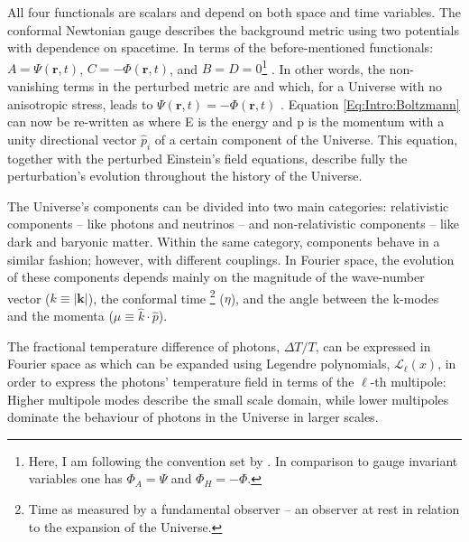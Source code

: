 All four functionals are scalars and depend on both space and time variables. The conformal Newtonian gauge \citep[][p. 87]{dods} describes the background metric using two potentials with dependence on spacetime. In terms of the before-mentioned functionals: $A = \Psi (\textbf{r}, t)$, $C = -\Phi (\textbf{r}, t)$, and $B=D=0$\footnote{Here, I am following the convention set by \cite{dods}. In comparison to \cite{1980Bardeen} gauge invariant variables one has $\Phi_A = \Psi$ and $\Phi_H = -\Phi$. } \citep{1995Gauges}. In other words, the non-vanishing terms in the perturbed metric are
and 
which, for a Universe with no anisotropic stress, leads to $\Psi (\textbf{r},t) = - \Phi(\textbf{r},t)$ \citep{Peacock}. Equation \eqref{Eq:Intro:Boltzmann} can now be re-written as
where E is the energy and p is the momentum with a unity directional vector $\hat{p}_i$ of a certain component of the Universe. This equation, together with the perturbed Einstein's field equations, describe fully the perturbation's evolution throughout the history of the Universe.

\qquad The Universe's components can be divided into two main categories: relativistic components -- like photons and neutrinos -- and non-relativistic components -- like dark and baryonic matter. Within the same category, components behave in a similar fashion; however, with different couplings. In Fourier space, the evolution of these components depends mainly on the magnitude of the wave-number vector ($k \equiv |\textbf{k}|$), the conformal time \footnote{Time as measured by a fundamental observer -- an observer at rest in relation to the expansion of the Universe.} ($\eta$), and the angle between the k-modes and the momenta ($\mu\equiv \hat{k} \cdot \hat{p}$). 

\qquad The fractional temperature difference of photons, $\Delta T/T$, can be expressed in Fourier space as
which can be expanded using Legendre polynomials, $\mathcal{L}_{\ell}(x)$, in order to express the photons' temperature field in terms of the $\ell$-th multipole:
Higher multipole modes describe the small scale domain, while lower multipoles dominate the behaviour of photons in the Universe in larger scales. 

